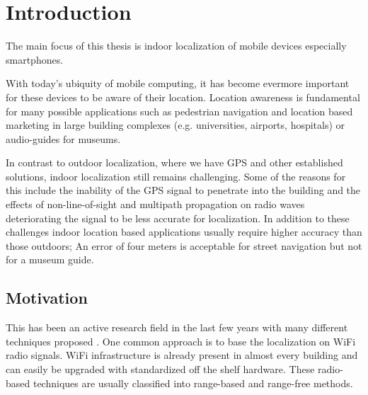 
\chapter{Introduction} %

\label{Chapter1} %


\newcommand{\keyword}[1]{\textbf{#1}}
\newcommand{\tabhead}[1]{\textbf{#1}}
\newcommand{\code}[1]{\texttt{#1}}
\newcommand{\file}[1]{\texttt{\bfseries#1}}
\newcommand{\option}[1]{\texttt{\itshape#1}}


The main focus of this thesis is indoor localization of mobile devices especially smartphones.

With today's ubiquity of mobile computing, it has become evermore important for these devices to be aware of their location. Location awareness is fundamental for many possible applications such as pedestrian navigation and location based marketing in large building complexes (e.g. universities, airports, hospitals) or audio-guides for museums.

In contrast to outdoor localization, where we have GPS and other established solutions, indoor localization still remains challenging. Some of the reasons for this include the inability of the GPS signal to penetrate into the building and the effects of non-line-of-sight and multipath propagation on radio waves deteriorating the signal to be less accurate for localization\cite{JoseMaster,multipathEffects}. In addition to these challenges indoor location based applications usually require higher accuracy than those outdoors; An error of four meters is acceptable for street navigation but not for a museum guide.

\section{Motivation}

This has been an active research field in the last few years with many different techniques proposed \cite{surveyIndoorTechniques,surveyWirelessPersonal}. One common approach is to base the localization on WiFi radio signals. WiFi infrastructure is already present in almost every building and can easily be upgraded with standardized off the shelf hardware. These radio-based techniques are usually classified into range-based and range-free methods\cite{FineGrainedIndoorTracking}.

